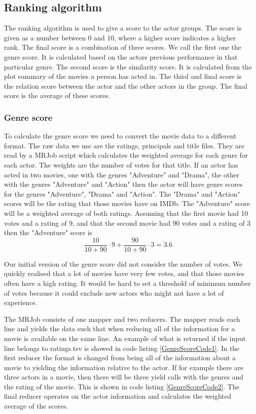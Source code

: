 \subsection{Ranking algorithm}

The ranking algorithm is used to give a score to the actor groups. The score is given as a number between 0 and 10, where a higher score indicates a higher rank. The final score is a combination of three scores. We call the first one the genre score. It is calculated based on the actors previous performance in that particular genre. The second score is the similarity score. It is calculated from the plot summary of the movies a person has acted in. The third and final score is the relation score between the actor and the other actors in the group. The final score is the average of these scores.



\subsubsection{Genre score}

To calculate the genre score we need to convert the movie data to a different format. The raw data we use are the ratings, principals and title files. They are read by a MRJob script which calculates the weighted average for each genre for each actor. The weights are the number of votes for that title. If an actor has acted in two movies, one with the genres "Adventure" and "Drama", the other with the genres "Adventure" and "Action" then the actor will have genre scores for the genres "Adventure", "Drama" and "Action". The "Drama" and "Action" scores will be the rating that those movies have on IMDb. The "Adventure" score will be a weighted average of both ratings. Assuming that the first movie had 10 votes and a rating of 9, and that the second movie had 90 votes and a rating of 3 then the "Adventure" score is $$\frac{10}{10+90}\cdot9+\frac{90}{10+90}\cdot3=3.6$$

Our initial version of the genre score did not consider the number of votes. We quickly realised that a lot of movies have very few votes, and that those movies often have a high rating. It would be hard to set a threshold of minimum number of votes because it could exclude new actors who might not have a lot of experience.

The MRJob consists of one mapper and two reducers. The mapper reads each line and yields the data such that when reducing all of the information for a movie is available on the same line. An example of what is returned if the input line belongs to ratings.tsv is showed in code listing \ref{GenreScoreCode1}. In the first reducer the format is changed from being all of the information about a movie to yielding the information relative to the actor. If for example there are three actors in a movie, then there will be three yield calls with the genres and the rating of the movie. This is shown in code listing \ref{GenreScoreCode2}. The final reducer operates on the actor information and calculates the weighted average of the scores.



